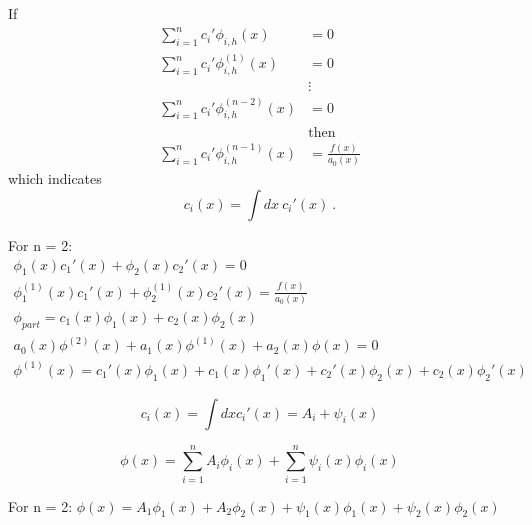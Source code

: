 \documentclass[12pt]{article}
\begin{document}
If 
\begin{align*}
\sum_{i=1}^n c_i'\phi_{i,h}(x) &= 0 \\
\sum_{i=1}^n c_i'\phi^{(1)}_{i,h}(x) &= 0 \\
&\vdots\\
\sum_{i=1}^n c_i'\phi^{(n-2)}_{i,h}(x) &= 0 \\
&\text{then} \\
\sum_{i=1}^n c_i'\phi^{(n-1)}_{i,h}(x) &= \frac{f(x)}{a_0(x)}
\end{align*}
which indicates
\begin{equation*}
c_i(x) = \int dx\:c_i'(x) \:.
\end{equation*}

For n = 2:
\vspace{-5 mm}
\begin{gather*}
\phi_1(x)c_1'(x) + \phi_2(x)c_2'(x) = 0 \\
\phi_1^{(1)}(x)c_1'(x) + \phi_2^{(1)}(x)c_2'(x) = \frac{f(x)}{a_0(x)} \\
\phi_{part} = c_1(x)\phi_1(x) + c_2(x)\phi_2(x) \\
a_0(x)\phi^{(2)}(x) + a_1(x)\phi^{(1)}(x) + a_2(x)\phi(x) = 0 \\
\phi^{(1)}(x) = c_1'(x)\phi_1(x) + c_1(x)\phi_1'(x) + c_2'(x)\phi_2(x) + c_2(x)\phi_2'(x)
\end{gather*}

\begin{equation*}
c_i(x) = \int dx c_i'(x) = A_i + \psi_i(x)
\end{equation*}

\begin{equation*}
\phi(x) = \sum_{i=1}^n A_i\phi_i(x) + \sum_{i=1}^n \psi_i(x)\phi_i(x)
\end{equation*}

For n = 2: $\phi(x) = A_1\phi_1(x) + A_2\phi_2(x) + \psi_1(x)\phi_1(x) + \psi_2(x)\phi_2(x)$
\end{document}
